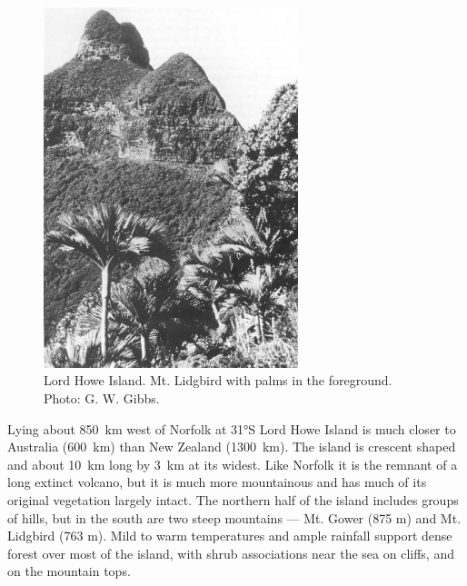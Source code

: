 \begin{figure}
	\includegraphics[width=0.66\textwidth]{graphics/figure120lord-howe-island.jpg}
	\centering
	\caption[Lord Howe Island]{Lord Howe Island.
	Mt. Lidgbird with  palms in the foreground.
	Photo: G. W. Gibbs.}%
	\label{fig:120lord-howe-island}
\end{figure}

Lying about \SI{850}{\kilo\metre} west of Norfolk at \ang{31}S Lord Howe Island is much closer to Australia (\SI{600}{\kilo\metre}) than New Zealand (\SI{1300}{\kilo\metre}).
The island is crescent shaped and about \SI{10}{\kilo\metre} long by \SI{3}{\kilo\metre} at its widest.
Like Norfolk it is the remnant of a long extinct volcano, but it is much more mountainous and has much of its original vegetation largely intact.
The northern half of the island includes groups of hills, but in the south are two steep mountains --- Mt.
Gower (875 m) and Mt.
Lidgbird (763 m).
Mild to warm temperatures and ample rainfall support dense forest over most of the island, with shrub associations near the sea on cliffs, and on the mountain tops.

